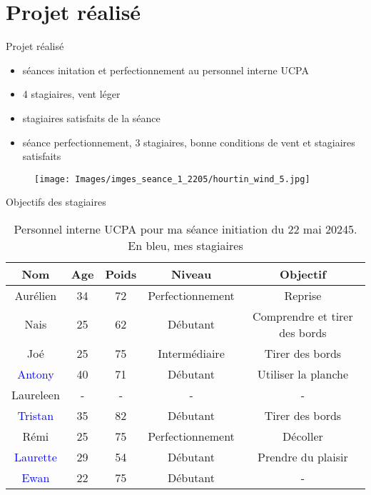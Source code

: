 \documentclass[10pt,a4paper]{beamer}
\begin{document}
\section{Projet réalisé}
\begin{frame}{Projet réalisé}
\begin{itemize}
\item séances initation et perfectionnement au personnel interne UCPA
\item 4 stagiaires, vent léger
\item stagiaires satisfaits de la séance
\item séance perfectionnement, 3 stagiaires, bonne conditions de vent et stagiaires satisfaits
\end{itemize}
\begin{figure}
\texttt{[image: Images/imges\_seance\_1\_2205/hourtin\_wind\_5.jpg]} 
\end{figure}
\end{frame}


\begin{frame}{Objectifs des stagiaires}
\small{
\begin{table}
\centering
\begin{tabular}{|c|c|c|c|c|}
        \hline
        \textbf{Nom} & \textbf{Age} & \textbf{Poids}& \textbf{Niveau}     &  \textbf{Objectif} \\ 
        \hline
        Aurélien      &  34          &  72           &   Perfectionnement  & Reprise \\
        Nais          &  25          &  62           &   Débutant          & Comprendre et tirer des bords \\
        Joé         &  25          &  75           &   Intermédiaire     & Tirer des bords \\
        \textcolor{blue}{Antony}        &  40          &  71           &   Débutant          & Utiliser la planche  \\
        Laureleen     &  -           &  -            &   -                 &   -  \\
        \textcolor{blue}{Tristan}       &  35          & 82            &  Débutant           & Tirer des bords  \\
        Rémi          &  25          & 75            &  Perfectionnement           &  Décoller  \\
        \textcolor{blue}{Laurette}      &  29          & 54            &  Débutant           & Prendre du plaisir \\
        \textcolor{blue}{Ewan}          &  22          & 75            & Débutant            &  -  \\
        \hline
\end{tabular}
\caption{Personnel interne UCPA pour ma séance initiation du 22 mai 20245. En bleu, 
mes stagiaires}
\end{table}}
\end{frame}
\end{document}
